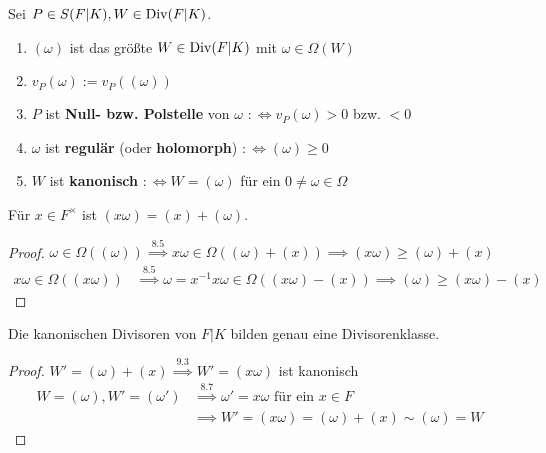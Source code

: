 \begin{definition}
    Sei $P \in S(F|K), W \in \operatorname{Div}(F|K)$.
    \begin{enumerate}[label=(\arabic*)]
        \item $(\omega)$ ist das größte $W \in \operatorname{Div}(F|K)$ mit $\omega \in \Omega(W)$
        \item $v_P(\omega) := v_P((\omega))$
        \item $P$ ist \textbf{Null- bzw. Polstelle} von $\omega$ $: \iff v_P(\omega) > 0$ bzw. $< 0$
        \item $\omega$ ist \textbf{regulär} (oder \textbf{holomorph}) $: \iff (\omega) \geq 0$
        \item $W$ ist \textbf{kanonisch} $:\iff W = (\omega)$ für ein $0 \ne \omega \in \Omega$
    \end{enumerate}
\end{definition}

\begin{lemma}
    Für $x \in F^\times$ ist $(x\omega) = (x) + (\omega)$.
\end{lemma}
\begin{proof}
    $\omega \in \Omega((\omega)) \stackrel{8.5}{\implies} x\omega \in \Omega((\omega)+(x)) \implies (x\omega) \geq (\omega)+(x)$
    \begin{align*}
        x\omega \in \Omega((x\omega)) & \stackrel{8.5}{\implies} \omega = x^{-1}x\omega\in \Omega((x\omega)-(x)) \implies (\omega) \geq (x\omega) - (x)
    \end{align*}
\end{proof}

\begin{satz}
    Die kanonischen Divisoren von $F|K$ bilden genau eine Divisorenklasse.
\end{satz}
\begin{proof}
    $W'=(\omega)+(x) \overset{\text{9.3}}{\implies} W' = (x\omega)$ ist kanonisch
    \begin{align*}
        W=(\omega),W'=(\omega') & \stackrel{8.7}{\implies} \omega'=x\omega \text{ für ein } x \in F\\
        & \implies W' = (x\omega) = (\omega) + (x) \sim (\omega) = W
    \end{align*}
\end{proof}

